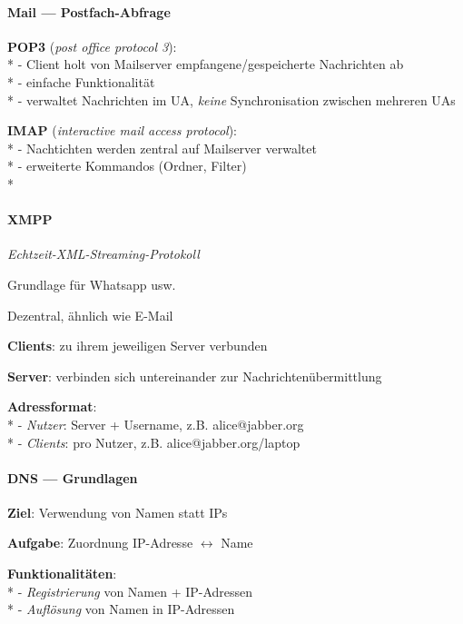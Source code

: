 \paragraph{Mail --- Postfach-Abfrage}
\begin{items}
  \item \textbf{POP3} (\emph{post office protocol 3}): \\*
    - Client holt von Mailserver empfangene/gespeicherte Nachrichten ab \\*
    - einfache Funktionalität \\*
    - verwaltet Nachrichten im UA, \emph{keine} Synchronisation zwischen mehreren UAs
  \item \textbf{IMAP} (\emph{interactive mail access protocol}): \\*
    - Nachtichten werden zentral auf Mailserver verwaltet \\*
    - erweiterte Kommandos (Ordner, Filter) \\*
\end{items}

\paragraph{XMPP}
\begin{items}
  \item \emph{Echtzeit-XML-Streaming-Protokoll}
  \item Grundlage für Whatsapp usw.
  \item Dezentral, ähnlich wie E-Mail
  \item \textbf{Clients}: zu ihrem jeweiligen Server verbunden
  \item \textbf{Server}: verbinden sich untereinander zur Nachrichtenübermittlung
  \item \textbf{Adressformat}: \\*
    - \emph{Nutzer}: Server + Username, z.B. alice@jabber.org \\*
    - \emph{Clients}: pro Nutzer, z.B. alice@jabber.org/laptop
\end{items}

\paragraph{DNS --- Grundlagen}
\begin{items}
  \item \textbf{Ziel}: Verwendung von Namen statt IPs
  \item \textbf{Aufgabe}: Zuordnung IP-Adresse \( \leftrightarrow \) Name
  \item \textbf{Funktionalitäten}: \\*
    - \emph{Registrierung} von Namen + IP-Adressen \\*
    - \emph{Auflösung} von Namen in IP-Adressen
\end{items}

